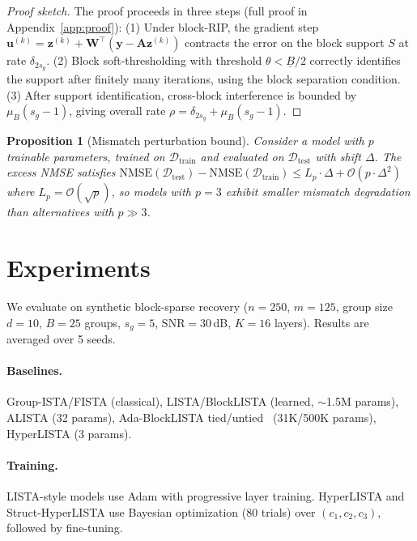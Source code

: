 \documentclass{article}
\newtheorem{proposition}{Proposition}
\begin{document}
\begin{proof}[Proof sketch]
The proof proceeds in three steps (full proof in Appendix~\ref{app:proof}): (1) Under block-RIP, the gradient step $\mathbf{u}^{(k)} = \mathbf{z}^{(k)} + \mathbf{W}^\top(\mathbf{y} - \mathbf{A}\mathbf{z}^{(k)})$ contracts the error on the block support $S$ at rate $\delta_{2s_g}$. (2) Block soft-thresholding with threshold $\theta < \underline{B}/2$ correctly identifies the support after finitely many iterations, using the block separation condition. (3) After support identification, cross-block interference is bounded by $\mu_B(s_g-1)$, giving overall rate $\rho = \delta_{2s_g} + \mu_B(s_g-1)$.
\end{proof}

\begin{proposition}[Mismatch perturbation bound]
\label{prop:mismatch}
Consider a model with $p$ trainable parameters, trained on $\mathcal{D}_{\text{train}}$ and evaluated on $\mathcal{D}_{\text{test}}$ with shift $\Delta$. The excess NMSE satisfies $\text{NMSE}(\mathcal{D}_{\text{test}}) - \text{NMSE}(\mathcal{D}_{\text{train}}) \leq L_p \cdot \Delta + \mathcal{O}(p \cdot \Delta^2)$
where $L_p = \mathcal{O}(\sqrt{p})$, so models with $p = 3$ exhibit smaller mismatch degradation than alternatives with $p \gg 3$.
\end{proposition}
\section{Experiments}

We evaluate on synthetic block-sparse recovery ($n{=}250$, $m{=}125$, group size $d{=}10$, $B{=}25$ groups, $s_g{=}5$, SNR$=$30\,dB, $K{=}16$ layers). Results are averaged over 5 seeds.

\paragraph{Baselines.} Group-ISTA/FISTA (classical), LISTA/BlockLISTA (learned, ${\sim}$1.5M params), ALISTA (32 params), Ada-BlockLISTA tied/untied~\cite{fu2021adablocklista} (31K/500K params), HyperLISTA (3 params).

\paragraph{Training.} LISTA-style models use Adam with progressive layer training. HyperLISTA and Struct-HyperLISTA use Bayesian optimization (80 trials) over $(c_1, c_2, c_3)$, followed by fine-tuning.
\end{document}
